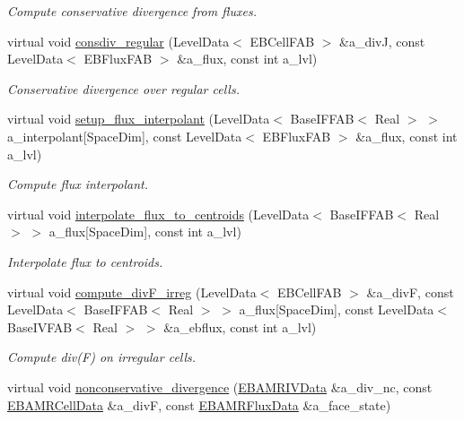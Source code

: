 \begin{DoxyCompactItemize}
\begin{DoxyCompactList}\small\item\em Compute conservative divergence from fluxes. \end{DoxyCompactList}\item 
virtual void \hyperlink{classcdr__solver_a8ce5b04d3bccdc5a8d96180cbd634e6a}{consdiv\+\_\+regular} (Level\+Data$<$ E\+B\+Cell\+F\+AB $>$ \&a\+\_\+divJ, const Level\+Data$<$ E\+B\+Flux\+F\+AB $>$ \&a\+\_\+flux, const int a\+\_\+lvl)
\begin{DoxyCompactList}\small\item\em Conservative divergence over regular cells. \end{DoxyCompactList}\item 
virtual void \hyperlink{classcdr__solver_aa82d0f22a54c86f0a4ae0a6c18f4aa0e}{setup\+\_\+flux\+\_\+interpolant} (Level\+Data$<$ Base\+I\+F\+F\+AB$<$ Real $>$ $>$ a\+\_\+interpolant\mbox{[}Space\+Dim\mbox{]}, const Level\+Data$<$ E\+B\+Flux\+F\+AB $>$ \&a\+\_\+flux, const int a\+\_\+lvl)
\begin{DoxyCompactList}\small\item\em Compute flux interpolant. \end{DoxyCompactList}\item 
virtual void \hyperlink{classcdr__solver_a22db8c360b26e32c920c61dbb34d43e9}{interpolate\+\_\+flux\+\_\+to\+\_\+centroids} (Level\+Data$<$ Base\+I\+F\+F\+AB$<$ Real $>$ $>$ a\+\_\+flux\mbox{[}Space\+Dim\mbox{]}, const int a\+\_\+lvl)
\begin{DoxyCompactList}\small\item\em Interpolate flux to centroids. \end{DoxyCompactList}\item 
virtual void \hyperlink{classcdr__solver_a74f7dd425b14f508a363b2892cbd9adb}{compute\+\_\+div\+F\+\_\+irreg} (Level\+Data$<$ E\+B\+Cell\+F\+AB $>$ \&a\+\_\+divF, const Level\+Data$<$ Base\+I\+F\+F\+AB$<$ Real $>$ $>$ a\+\_\+flux\mbox{[}Space\+Dim\mbox{]}, const Level\+Data$<$ Base\+I\+V\+F\+AB$<$ Real $>$ $>$ \&a\+\_\+ebflux, const int a\+\_\+lvl)
\begin{DoxyCompactList}\small\item\em Compute div(\+F) on irregular cells. \end{DoxyCompactList}\item 
virtual void \hyperlink{classcdr__solver_a940ad2bdcf61d65677f85044d81b1c37}{nonconservative\+\_\+divergence} (\hyperlink{type__definitions_8H_a6b8fa905d55cbb491b52180386f0e0c1}{E\+B\+A\+M\+R\+I\+V\+Data} \&a\+\_\+div\+\_\+nc, const \hyperlink{type__definitions_8H_a7e610f301989e5e07781c5e338bdb7c3}{E\+B\+A\+M\+R\+Cell\+Data} \&a\+\_\+divF, const \hyperlink{type__definitions_8H_aadad278b2e5d3d4abcf9032f90ba78c3}{E\+B\+A\+M\+R\+Flux\+Data} \&a\+\_\+face\+\_\+state)

\end{DoxyCompactItemize}

